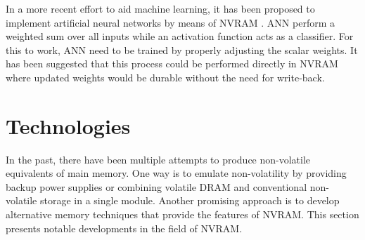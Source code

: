 In a more recent effort to aid machine learning, it has been proposed to
implement artificial neural networks by means of NVRAM
\cite{fumarola2016accelerating}. ANN perform a weighted sum over all inputs
while an activation function acts as a classifier. For this to work, ANN need to
be trained by properly adjusting the scalar weights. It has been suggested that
this process could be performed directly in NVRAM where updated weights would be
durable without the need for write-back.

\section{Technologies}

In the past, there have been multiple attempts to produce non-volatile
equivalents of main memory. One way is to emulate non-volatility by providing
backup power supplies or combining volatile DRAM and conventional non-volatile
storage in a single module. Another promising approach is to develop alternative
memory techniques that provide the features of NVRAM. This section presents
notable developments in the field of NVRAM.

